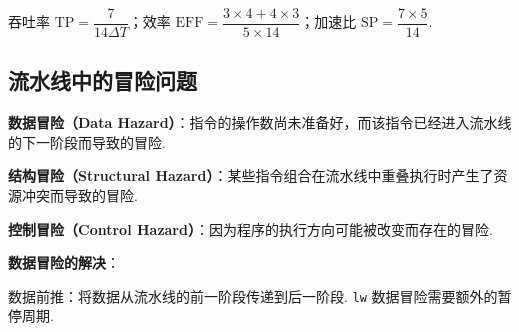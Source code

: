 \documentclass[cn, hazy, blue, normal, 12pt]{elegantnote}
\begin{document}
\begin{center}
{\begin{minipage}{.95\linewidth}
\begin{minipage}{.9\linewidth}
            \end{minipage}

            吞吐率 $\text{TP} = \dfrac{7}{14\Delta T}$；效率 $\text{EFF} = \dfrac{3 \times 4 + 4 \times 3}{5 \times 14}$；加速比 $\text{SP} = \dfrac{7 \times 5}{14}$.

        \end{minipage}
    }
\end{center}

\subsection{流水线中的冒险问题}

\textbf{数据冒险（Data Hazard）}：指令的操作数尚未准备好，而该指令已经进入流水线的下一阶段而导致的冒险.

\textbf{结构冒险（Structural Hazard）}：某些指令组合在流水线中重叠执行时产生了资源冲突而导致的冒险.

\textbf{控制冒险（Control Hazard）}：因为程序的执行方向可能被改变而存在的冒险.

\textbf{数据冒险的解决}：

数据前推：将数据从流水线的前一阶段传递到后一阶段. \lstinline{lw} 数据冒险需要额外的暂停周期.
\end{document}
